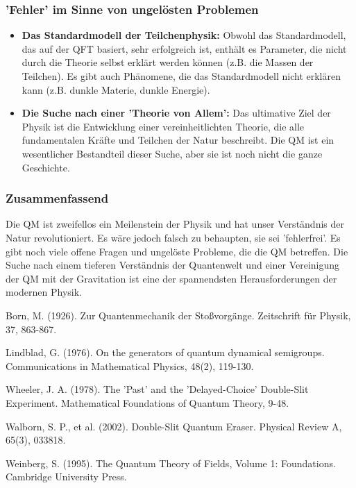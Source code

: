 \documentclass{article}
\begin{document}
\subsubsection{'Fehler' im Sinne von ungelösten Problemen}

\begin{itemize}
	\item \textbf{Das Standardmodell der Teilchenphysik:} Obwohl das Standardmodell, das auf der QFT basiert, sehr erfolgreich ist, enthält es Parameter, die nicht durch die Theorie selbst erklärt werden können (z.B. die Massen der Teilchen). Es gibt auch Phänomene, die das Standardmodell nicht erklären kann (z.B. dunkle Materie, dunkle Energie).
	\item \textbf{Die Suche nach einer 'Theorie von Allem':} Das ultimative Ziel der Physik ist die Entwicklung einer vereinheitlichten Theorie, die alle fundamentalen Kräfte und Teilchen der Natur beschreibt. Die QM ist ein wesentlicher Bestandteil dieser Suche, aber sie ist noch nicht die ganze Geschichte.
\end{itemize}

\subsubsection{Zusammenfassend}

Die QM ist zweifellos ein Meilenstein der Physik und hat unser Verständnis der Natur revolutioniert. Es wäre jedoch falsch zu behaupten, sie sei 'fehlerfrei'. Es gibt noch viele offene Fragen und ungelöste Probleme, die die QM betreffen. Die Suche nach einem tieferen Verständnis der Quantenwelt und einer Vereinigung der QM mit der Gravitation ist eine der spannendsten Herausforderungen der modernen Physik.
		
	\begin{thebibliography}{9}
		 Born, M. (1926). Zur Quantenmechanik der Stoßvorgänge. Zeitschrift für Physik, 37, 863-867.
		
		 Lindblad, G. (1976). On the generators of quantum dynamical semigroups. Communications in Mathematical Physics, 48(2), 119-130.
		
		 Wheeler, J. A. (1978). The 'Past' and the 'Delayed-Choice' Double-Slit Experiment. Mathematical Foundations of Quantum Theory, 9-48.
		
		 Walborn, S. P., et al. (2002). Double-Slit Quantum Eraser. Physical Review A, 65(3), 033818.
		
		 Weinberg, S. (1995). The Quantum Theory of Fields, Volume 1: Foundations. Cambridge University Press.
	\end{thebibliography}
\end{document}
